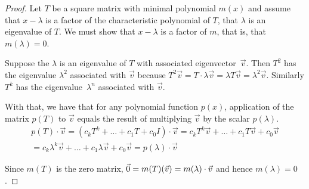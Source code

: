 \begin{proof}
Let \( T \) be a square matrix with minimal polynomial \( m(x) \) and 
assume that \( x-\lambda \) is a factor of the characteristic polynomial of 
\( T \), that \( \lambda \) is an eigenvalue of \( T \).
We must show that $x-\lambda$ is a factor of $m$, that is, that 
$m(\lambda)=0$.

Suppose the $\lambda$ is an eigenvalue of $T$ with associated 
eigenvector~$\vec{v}$.
Then $T^2$ has the eigenvalue $\lambda^2$ associated with $\vec{v}$
because $T^2\vec{v}=T\cdot\lambda\vec{v}=\lambda T\vec{v}=\lambda^2\vec{v}$.
Similarly $T^k$ has the eigenvalue~$\lambda^n$ associated with $\vec{v}$.

With that, we have that 
for any polynomial function \( p(x) \), application of the matrix \( p(T) \)
to \( \vec{v} \) equals the result of multiplying \( \vec{v} \) by the scalar
\( p(\lambda) \).
\begin{multline*}
  p(T)\cdot\vec{v}
  =(c_kT^k+\dots+c_1T+c_0I)\cdot\vec{v}
  =c_kT^k\vec{v}+\dots+c_1T\vec{v}+c_0\vec{v}  \\
  =c_k\lambda^k\vec{v}+\dots+c_1\lambda\vec{v}+c_0\vec{v}
  =p(\lambda)\cdot\vec{v}
\end{multline*}

Since \( m(T) \) is the zero matrix,
\( \vec{0}=m(T)(\vec{v})=m(\lambda)\cdot\vec{v} \) and
hence \( m(\lambda)=0 \).
\end{proof}

